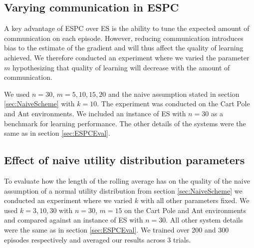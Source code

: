 \subsection{Varying communication in ESPC}
A key advantage of ESPC over ES is the ability to tune the expected amount of communication on each episode. However, reducing communication introduces bias to the estimate of the gradient and will thus affect the quality of learning achieved. We therefore conducted an experiment where we varied the parameter $m$ hypothesizing that quality of learning will decrease with the amount of communication.

We used $n=30$, $m=5,10,15,20$ and the naive assumption stated in section \ref{sec:NaiveScheme} with $k=10$. The experiment was conducted on the Cart Pole and Ant environments. We included an instance of ES with $n=30$ as a benchmark for learning performance. The other details of the systems were the same as in section \ref{sec:ESPCEval}.

\subsection{Effect of naive utility distribution parameters}

To evaluate how the length of the rolling average has on the quality of the naive assumption of a normal utility distribution from section \ref{sec:NaiveScheme} we conducted an experiment where we varied $k$ with all other parameters fixed. We used $k=3,10,30$ with $n=30$, $m=15$ on the Cart Pole and Ant environments and compared against an instance of ES with $n=30$. All other system details were the same as in section \ref{sec:ESPCEval}. We trained over 200 and 300 episodes respectively and averaged our results across 3 trials.


    
